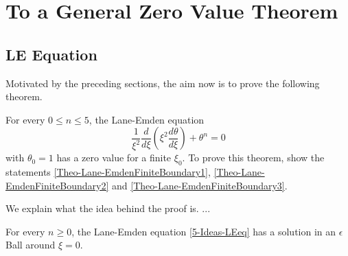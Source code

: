 \section{To a General Zero Value Theorem}
\subsection{LE Equation}
Motivated by the preceding sections, the aim now is to prove the following theorem.
\begin{theorem}
	\label{Theo-Lane-EmdenFiniteBoundary}
	For every $0\leq n\leq5$, the Lane-Emden equation
	\begin{equation}
		\frac{1}{\xi^2}\frac{d}{d\xi}\left(\xi^2\frac{d\theta}{d\xi}\right)+\theta^n=0
		\label{5-Ideas-LEeq}
	\end{equation}
	with $\theta_0=1$ has a zero value for a finite $\xi_0$. To prove this theorem, show the statements \ref{Theo-Lane-EmdenFiniteBoundary1}, 
	\ref{Theo-Lane-EmdenFiniteBoundary2} and \ref{Theo-Lane-EmdenFiniteBoundary3}.
\end{theorem}
We explain what the idea behind the proof is.
...
\begin{lemma}
	\label{Theo-Lane-EmdenFiniteBoundary1}
	For every $n\geq0$, the Lane-Emden equation \ref{5-Ideas-LEeq} has a solution in an $\epsilon$ Ball around $\xi=0$.
\end{lemma}
